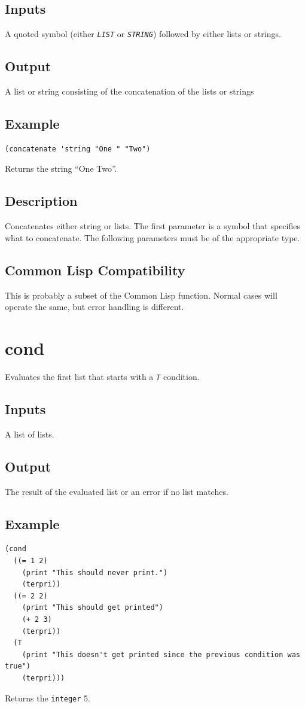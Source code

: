 \documentclass[10pt, openany]{book}
\newcommand{\constant}[1]{\emph{\texttt{#1}}}
\newcommand{\datatype}[1]{\texttt{#1}}
\newcommand{\cl}{Common Lisp}
\begin{document}
\subsection{Inputs}
A quoted symbol (either \constant{LIST} or \constant{STRING}) followed by either lists or strings.
\subsection{Output}
A list or string consisting of the concatenation of the lists or strings
\subsection{Example}
\begin{lstlisting}
(concatenate 'string "One " "Two")
\end{lstlisting}
Returns the string ``One Two''.
\subsection{Description}
Concatenates either string or lists.  The first parameter is a symbol that specifies what to concatenate.  The following parameters must be of the appropriate type.
\subsection{Common Lisp Compatibility}
This is probably a subset of the \cl{} function.  Normal cases will operate the same, but error handling is different.

\section{cond}
Evaluates the first list that starts with a \constant{T} condition.
\subsection{Inputs}
A list of lists.
\subsection{Output}
The result of the evaluated list or an error if no list matches.
\subsection{Example}
\begin{lstlisting}
(cond
  ((= 1 2)
    (print "This should never print.")
    (terpri))
  ((= 2 2)
    (print "This should get printed")
    (+ 2 3)
    (terpri))
  (T
    (print "This doesn't get printed since the previous condition was true")
    (terpri)))
\end{lstlisting}
Returns the \datatype{integer} 5.
\end{document}
